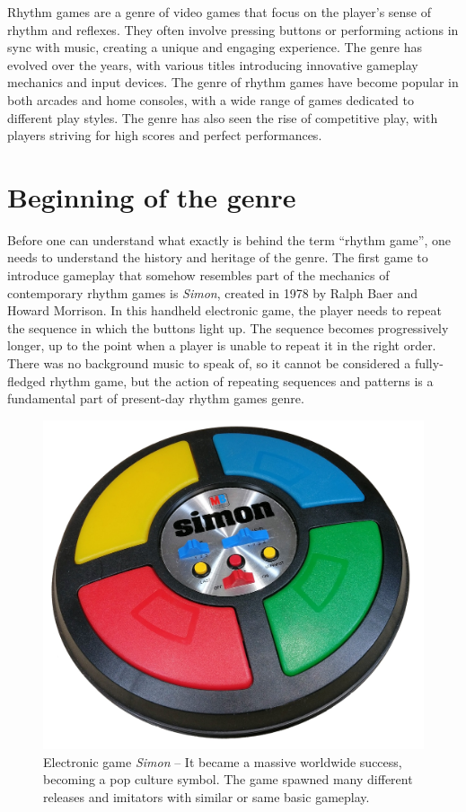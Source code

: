 Rhythm games are a genre of video games that focus on the player’s sense of rhythm and reflexes. They often involve pressing buttons or performing actions in sync with music, creating a unique and engaging experience. The genre has evolved over the years, with various titles introducing innovative gameplay mechanics and input devices. The genre of rhythm games have become popular in both arcades and home consoles, with a wide range of games dedicated to different play styles. The genre has also seen the rise of competitive play, with players striving for high scores and perfect performances. 

\section{Beginning of the genre}
Before one can understand what exactly is behind the term “rhythm game”, one needs to understand the history and heritage of the genre. The first game to introduce gameplay that somehow resembles part of the mechanics of contemporary rhythm games is \textit{Simon}, created in 1978 by Ralph Baer and Howard Morrison. In this handheld electronic game, the player needs to repeat the sequence in which the buttons light up. The sequence becomes progressively longer, up to the point when a player is unable to repeat it in the right order. There was no background music to speak of, so it cannot be considered a fully-fledged rhythm game, but the action of repeating sequences and patterns is a fundamental part of present-day rhythm games genre.

\begin{figure}[h]
    \centering\includegraphics[scale=0.05]{obrazki/simon.jpg}
    \caption{Electronic game \textit{Simon} -- It became a massive worldwide success, becoming a pop culture symbol. The game spawned many different releases and imitators with similar or same basic gameplay. \cite{simongame}}
    \label{fig:simon_game}
\end{figure}


